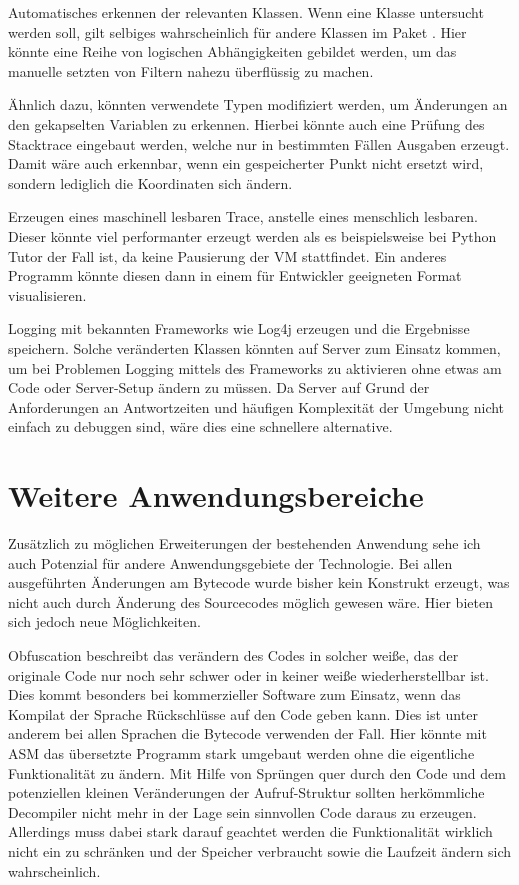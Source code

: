 Automatisches erkennen der relevanten Klassen. Wenn eine Klasse  untersucht werden soll, gilt selbiges wahrscheinlich für andere Klassen im Paket . Hier könnte eine Reihe von logischen Abhängigkeiten gebildet werden, um das manuelle setzten von Filtern nahezu überflüssig zu machen.

Ähnlich dazu, könnten verwendete Typen modifiziert werden, um Änderungen an den gekapselten Variablen zu erkennen. Hierbei könnte auch eine Prüfung des Stacktrace eingebaut werden, welche nur in bestimmten Fällen Ausgaben erzeugt. Damit wäre auch erkennbar, wenn ein gespeicherter Punkt nicht ersetzt wird, sondern lediglich die Koordinaten sich ändern.

Erzeugen eines maschinell lesbaren Trace, anstelle eines menschlich lesbaren. Dieser könnte viel performanter erzeugt werden als es beispielsweise bei Python Tutor der Fall ist, da keine Pausierung der \ac{VM} stattfindet. Ein anderes Programm könnte diesen dann in einem für Entwickler geeigneten Format visualisieren.

Logging mit bekannten Frameworks wie Log4j erzeugen und die Ergebnisse speichern. Solche veränderten Klassen könnten auf Server zum Einsatz kommen, um bei Problemen Logging mittels des Frameworks zu aktivieren ohne etwas am Code oder Server-Setup ändern zu müssen. Da Server auf Grund der Anforderungen an Antwortzeiten und häufigen Komplexität der Umgebung nicht einfach zu debuggen sind, wäre dies eine schnellere alternative.

\section{Weitere Anwendungsbereiche} 

Zusätzlich zu möglichen Erweiterungen der bestehenden Anwendung sehe ich auch Potenzial für andere Anwendungsgebiete der Technologie. Bei allen ausgeführten Änderungen am Bytecode wurde bisher kein Konstrukt erzeugt, was nicht auch durch Änderung des Sourcecodes möglich gewesen wäre. Hier bieten sich jedoch neue Möglichkeiten.

Obfuscation beschreibt das verändern des Codes in solcher weiße, das der originale Code nur noch sehr schwer oder in keiner weiße wiederherstellbar ist. Dies kommt besonders bei kommerzieller Software zum Einsatz, wenn das Kompilat der Sprache Rückschlüsse auf den Code geben kann. Dies ist unter anderem bei allen Sprachen die Bytecode verwenden der Fall.
Hier könnte mit ASM das übersetzte Programm stark umgebaut werden ohne die eigentliche Funktionalität zu ändern. Mit Hilfe von Sprüngen quer durch den Code und dem potenziellen kleinen Veränderungen der Aufruf-Struktur sollten herkömmliche Decompiler nicht mehr in der Lage sein sinnvollen Code daraus zu erzeugen. Allerdings muss dabei stark darauf geachtet werden die Funktionalität wirklich nicht ein zu schränken und der Speicher verbraucht sowie die Laufzeit ändern sich wahrscheinlich.

